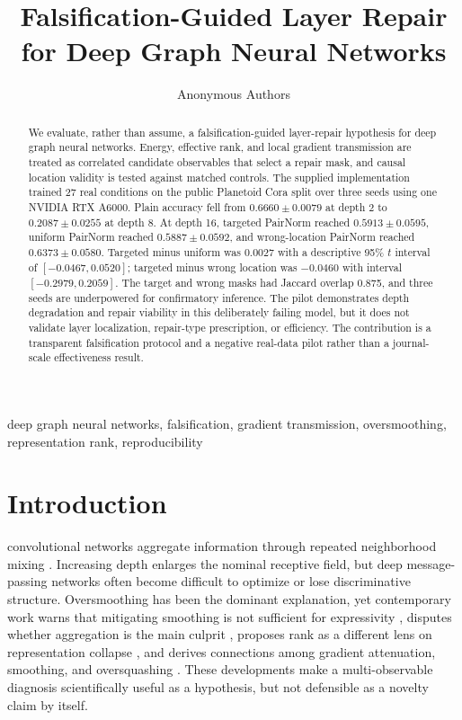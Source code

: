 \documentclass[journal]{IEEEtran}
\title{Falsification-Guided Layer Repair for Deep Graph Neural Networks}
\author{Anonymous Authors}
\begin{document}
\maketitle

\begin{abstract}
We evaluate, rather than assume, a falsification-guided layer-repair hypothesis for deep graph neural networks. Energy, effective rank, and local gradient transmission are treated as correlated candidate observables that select a repair mask, and causal location validity is tested against matched controls. The supplied implementation trained 27 real conditions on the public Planetoid Cora split over three seeds using one NVIDIA RTX A6000. Plain accuracy fell from $0.6660 \pm 0.0079$ at depth 2 to $0.2087 \pm 0.0255$ at depth 8. At depth 16, targeted PairNorm reached $0.5913 \pm 0.0595$, uniform PairNorm reached $0.5887 \pm 0.0592$, and wrong-location PairNorm reached $0.6373 \pm 0.0580$. Targeted minus uniform was $0.0027$ with a descriptive 95\% $t$ interval of $[-0.0467,0.0520]$; targeted minus wrong location was $-0.0460$ with interval $[-0.2979,0.2059]$. The target and wrong masks had Jaccard overlap 0.875, and three seeds are underpowered for confirmatory inference. The pilot demonstrates depth degradation and repair viability in this deliberately failing model, but it does not validate layer localization, repair-type prescription, or efficiency. The contribution is a transparent falsification protocol and a negative real-data pilot rather than a journal-scale effectiveness result.
\end{abstract}

\begin{IEEEkeywords}
deep graph neural networks, falsification, gradient transmission, oversmoothing, representation rank, reproducibility
\end{IEEEkeywords}

\section{Introduction}

 convolutional networks aggregate information through repeated neighborhood mixing \cite{kipf2017gcn}. Increasing depth enlarges the nominal receptive field, but deep message-passing networks often become difficult to optimize or lose discriminative structure. Oversmoothing has been the dominant explanation, yet contemporary work warns that mitigating smoothing is not sufficient for expressivity \cite{rusch2023survey}, disputes whether aggregation is the main culprit \cite{park2025fallacy}, proposes rank as a different lens on representation collapse \cite{zhang2026rank}, and derives connections among gradient attenuation, smoothing, and oversquashing \cite{arroyo2025bridging}. These developments make a multi-observable diagnosis scientifically useful as a hypothesis, but not defensible as a novelty claim by itself.
\end{document}
